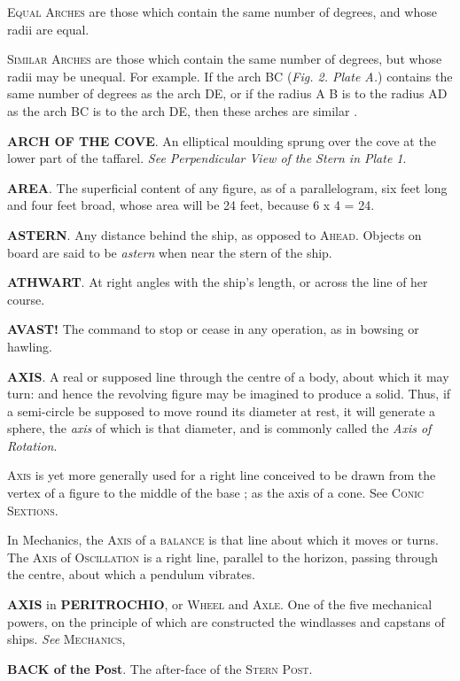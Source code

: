\textsc{Equal Arches} are those which contain the same number of degrees, and whose radii are equal. 

\textsc{Similar Arches} are those which contain the same number of degrees, but whose radii may be unequal. For example. If the arch BC (\textit{Fig. 2. Plate A.}) contains the same number of degrees as the arch DE, or if the radius A B is to the radius AD as the arch BC is to the arch DE, then these arches are similar . 

\textbf{ARCH OF THE COVE}. An elliptical moulding sprung over the cove at the lower part of the taffarel. \textit{See Perpendicular View of the Stern in Plate 1}. 

\textbf{AREA}. The superficial content of any figure, as of a parallelogram, six feet long and four feet broad, whose area will be 24 feet, because 6 x 4 = 24. 

\textbf{ASTERN}. Any distance behind the ship, as opposed to \textsc{Ahead}. Objects on board are said to be \textit{astern} when near the stern of the ship. 

\textbf{ATHWART}. At right angles with the ship's length, or across the line of her course. 

\textbf{AVAST!} The command to stop or cease in any operation, as in bowsing or hawling. 

\textbf{AXIS}. A real or supposed line through the centre of a body, about which it may turn: and hence the revolving figure may be imagined to produce a solid. Thus, if a semi-circle be supposed to move round its diameter at rest, it will generate a sphere, the \textit{axis} of which is that diameter, and is commonly called the \textit{Axis of Rotation}. 

\textsc{Axis} is yet more generally used for a right line conceived to be drawn from the vertex of a figure to the middle of the base ; as the axis of a cone. See \textsc{Conic Sextions}. 

In Mechanics, the \textsc{Axis} of a \textsc{balance} is that line about which it moves or turns. The \textsc{Axis} of \textsc{Oscillation} is a right line, parallel to the horizon, passing through the centre, about which a pendulum vibrates. 

\textbf{AXIS} in \textbf{PERITROCHIO}, or \textsc{Wheel} and \textsc{Axle}. One of the five mechanical powers, on the principle of which are constructed the windlasses and capstans of ships. \textit{See} \textsc{Mechanics}, 

\textbf{BACK of the Post}. The after-face of the \textsc{Stern Post}. 

